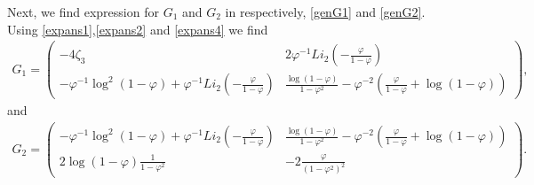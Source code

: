 {{Next, we find expression for $G_1$ and $G_2$ in respectively, \eqref{genG1} and \eqref{genG2}. Using \eqref{expans1},\eqref{expans2} and \eqref{expans4}  we find 
\begin{align*}
   G_{1} = \begin{pmatrix}
-4 \zeta_3 &  2 \varphi^{-1} Li_2(-\frac{\varphi}{1-\varphi}) \\
 - \varphi^{-1} \log^2(1- \varphi) + \varphi^{-1} Li_2(-\frac{\varphi}{1-\varphi}) & \frac{\log(1-\varphi)}{1-\varphi^2} - \varphi^{-2} \left(\frac{\varphi }{1-\varphi } + \log(1-\varphi )\right) 
\end{pmatrix},  
\end{align*}
and
\begin{align*}
    G_{2} = \begin{pmatrix}
 - \varphi^{-1} \log^2(1- \varphi) + \varphi^{-1} Li_2(-\frac{\varphi}{1-\varphi})  & \frac{\log(1-\varphi)}{1-\varphi^2} - \varphi^{-2} \left(\frac{\varphi }{1-\varphi } + \log(1-\varphi )\right) \\
2\log(1-\varphi) \frac{1}{1-\varphi^2}& -2 \frac{\varphi}{(1-\varphi^2)^2}
\end{pmatrix}.
\end{align*}


}}
